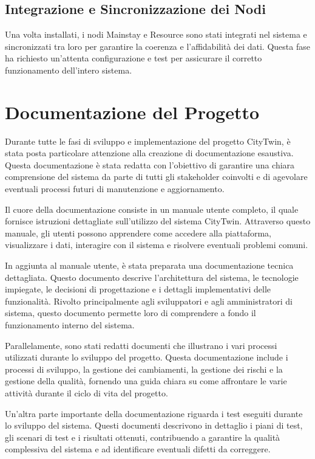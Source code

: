 \subsection{Integrazione e Sincronizzazione dei Nodi}

Una volta installati, i nodi Mainstay e Resource sono stati integrati nel sistema e sincronizzati tra loro per garantire la coerenza e l'affidabilità dei dati. Questa fase ha richiesto un'attenta configurazione e test per assicurare il corretto funzionamento dell'intero sistema.

\section{Documentazione del Progetto}
Durante tutte le fasi di sviluppo e implementazione del progetto CityTwin, è stata posta particolare attenzione alla creazione di documentazione esaustiva. Questa documentazione è stata redatta con l'obiettivo di garantire una chiara comprensione del sistema da parte di tutti gli stakeholder coinvolti e di agevolare eventuali processi futuri di manutenzione e aggiornamento.

Il cuore della documentazione consiste in un manuale utente completo, il quale fornisce istruzioni dettagliate sull'utilizzo del sistema CityTwin. Attraverso questo manuale, gli utenti possono apprendere come accedere alla piattaforma, visualizzare i dati, interagire con il sistema e risolvere eventuali problemi comuni.

In aggiunta al manuale utente, è stata preparata una documentazione tecnica dettagliata. Questo documento descrive l'architettura del sistema, le tecnologie impiegate, le decisioni di progettazione e i dettagli implementativi delle funzionalità. Rivolto principalmente agli sviluppatori e agli amministratori di sistema, questo documento permette loro di comprendere a fondo il funzionamento interno del sistema.

Parallelamente, sono stati redatti documenti che illustrano i vari processi utilizzati durante lo sviluppo del progetto. Questa documentazione include i processi di sviluppo, la gestione dei cambiamenti, la gestione dei rischi e la gestione della qualità, fornendo una guida chiara su come affrontare le varie attività durante il ciclo di vita del progetto.

Un'altra parte importante della documentazione riguarda i test eseguiti durante lo sviluppo del sistema. Questi documenti descrivono in dettaglio i piani di test, gli scenari di test e i risultati ottenuti, contribuendo a garantire la qualità complessiva del sistema e ad identificare eventuali difetti da correggere.

